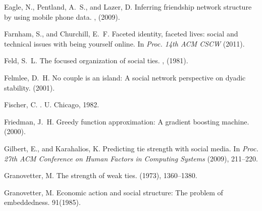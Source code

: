 \documentclass{sigchi}
\begin{document}
\begin{thebibliography}{10}

Eagle, N., Pentland, A.~S., and Lazer, D.
\newblock Inferring friendship network structure by using mobile phone data.
, (2009). %

Farnham, S., and Churchill, E.~F.
\newblock Faceted identity, faceted lives: social and technical issues with
  being yourself online.
\newblock In {\em Proc. 14th ACM CSCW} (2011). 

Feld, S.~L.
\newblock The focused organization of social ties.
, (1981). %

Felmlee, D.~H.
\newblock No couple is an island: A social network perspective on dyadic
  stability.
 (2001).

Fischer, C.
.
\newblock U. Chicago, 1982.

Friedman, J.~H.
\newblock Greedy function approximation: A gradient boosting machine.
 (2000). %

Gilbert, E., and Karahalios, K.
\newblock Predicting tie strength with social media.
\newblock In {\em Proc. 27th ACM Conference on Human Factors in Computing
  Systems} (2009), 211--220.

Granovetter, M.
\newblock The strength of weak ties.
 (1973), 1360--1380.


Granovetter, M.
\newblock Economic action and social structure: {The} problem of embeddedness.
 91(1985).


\end{thebibliography}
\end{document}
